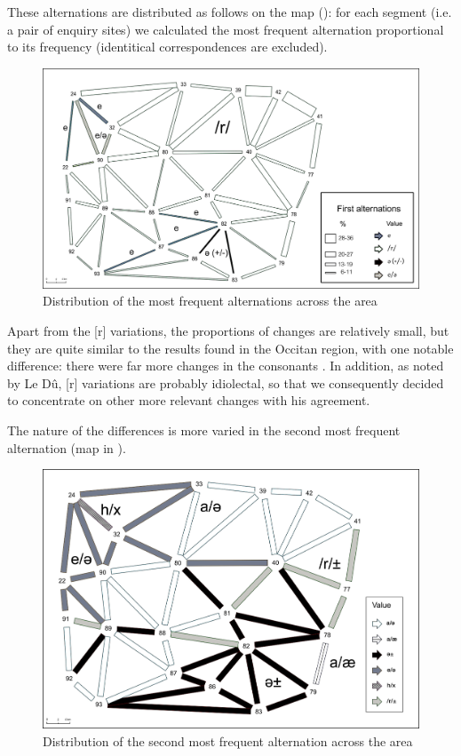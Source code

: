 \documentclass[output=paper]{LSP/langsci}
\begin{document}
These alternations are distributed as follows on the map (): for each segment (i.e. a pair of enquiry sites) we calculated the most frequent alternation proportional to its frequency (identitical correspondences are excluded).

\begin{figure}
\includegraphics[width=\textwidth]{illustrations/brun_etal_fig4}
\caption{Distribution of the most frequent alternations across the area}
\label{fig:4}
\end{figure}

Apart from the [r] variations, the proportions of changes are relatively small, but they are quite similar to the results found in the Occitan region, with one notable difference: there were far more changes in the consonants \cite[135]{brun-trigaud_usage_2014}. In addition, as noted by Le Dû, [r] variations are probably idiolectal, so that we consequently decided to concentrate on other more relevant changes with his agreement.

The nature of the differences is more varied in the second most frequent alternation (map in ).

\begin{figure}
\includegraphics[width=\textwidth]{illustrations/brun_etal_fig5}
\caption{\textup{Distribution of the second most frequent alternation across the area}}
\label{fig:5}
\end{figure}
\end{document}
